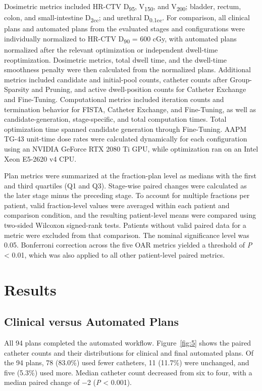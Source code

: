 \documentclass[12pt,twoside,letterpaper]{article}
\begin{document}
Dosimetric metrics included HR-CTV D\textsubscript{95}, V\textsubscript{150}, and V\textsubscript{200}; bladder, rectum, colon, and small-intestine D\textsubscript{2cc}; and urethral D\textsubscript{0.1cc}. For comparison, all clinical plans and automated plans from the evaluated stages and configurations were individually normalized to HR-CTV D\textsubscript{90} = 600 cGy, with automated plans normalized after the relevant optimization or independent dwell-time reoptimization. Dosimetric metrics, total dwell time, and the dwell-time smoothness penalty were then calculated from the normalized plans. Additional metrics included candidate and initial-pool counts, catheter counts after Group-Sparsity and Pruning, and active dwell-position counts for Catheter Exchange and Fine-Tuning. Computational metrics included iteration counts and termination behavior for FISTA, Catheter Exchange, and Fine-Tuning, as well as candidate-generation, stage-specific, and total computation times. Total optimization time spanned candidate generation through Fine-Tuning. AAPM TG-43 unit-time dose rates\cite{ref79} were calculated dynamically for each configuration using an NVIDIA GeForce RTX 2080 Ti GPU, while optimization ran on an Intel Xeon E5-2620 v4 CPU.

Plan metrics were summarized at the fraction-plan level as medians with the first and third quartiles (Q1 and Q3). Stage-wise paired changes were calculated as the later stage minus the preceding stage. To account for multiple fractions per patient, valid fraction-level values were averaged within each patient and comparison condition, and the resulting patient-level means were compared using two-sided Wilcoxon signed-rank tests. Patients without valid paired data for a metric were excluded from that comparison. The nominal significance level was 0.05. Bonferroni correction across the five OAR metrics yielded a threshold of \emph{P} < 0.01, which was also applied to all other patient-level paired metrics.

\FloatBarrier
\section{Results}\label{sec:3}

\subsection{Clinical versus Automated Plans}\label{sec:3-1}

All 94 plans completed the automated workflow. Figure~\ref{fig:5} shows the paired catheter counts and their distributions for clinical and final automated plans. Of the 94 plans, 78 (83.0\%) used fewer catheters, 11 (11.7\%) were unchanged, and five (5.3\%) used more. Median catheter count decreased from six to four, with a median paired change of \ensuremath{-}2 (\emph{P} < 0.001).
\end{document}
